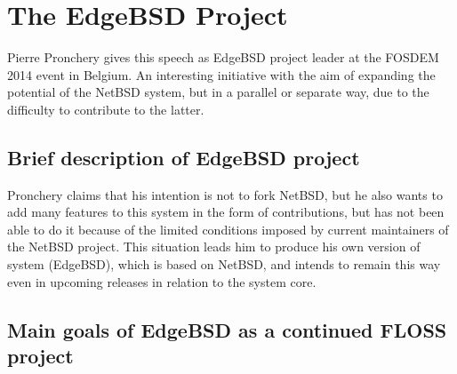 \documentclass[11pt]{article} %
\begin{document}
\section{The EdgeBSD Project}

Pierre Pronchery gives this speech as EdgeBSD project leader at the FOSDEM 2014 event in Belgium. An interesting initiative with the aim of expanding the potential of the NetBSD system, but in a parallel or separate way, due to the difficulty to contribute to the latter.

\subsection{Brief description of EdgeBSD project}

Pronchery claims that his intention is not to fork NetBSD, but he also wants to add many features to this system in the form of contributions, but has not been able to do it because of the limited conditions imposed by current maintainers of the NetBSD project. This situation leads him to produce his own version of system (EdgeBSD), which is based on NetBSD, and intends to remain this way even in upcoming releases in relation to the system core.

\subsection{Main goals of EdgeBSD as a continued FLOSS project}
\end{document}
